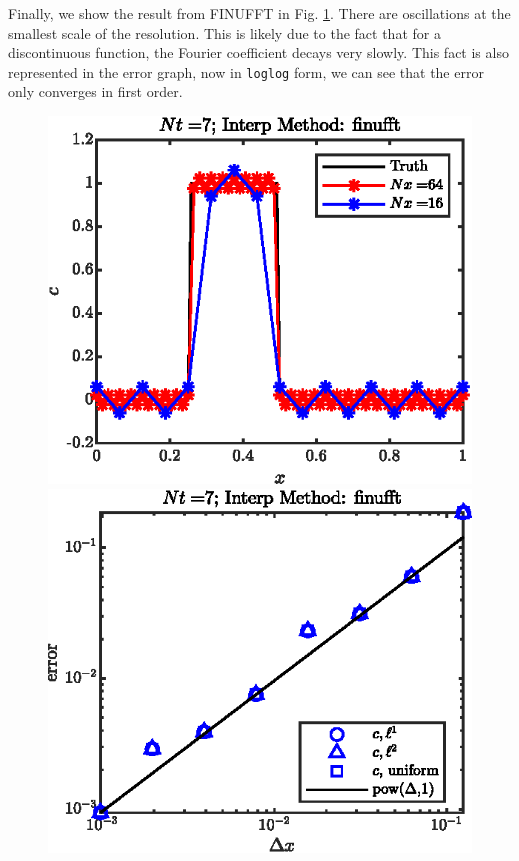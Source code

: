 \documentclass[11pt,letterpaper]{article}
\begin{document}
Finally, we show the result from FINUFFT in Fig. \ref{fig:1D_step_cons_finufft_sol}. There are oscillations at the smallest scale of the resolution. This is likely due to the fact that for a discontinuous function, the Fourier coefficient decays very slowly. This fact is also represented in the error graph, now in \texttt{loglog} form, we can see that the error only converges in first order. 
\begin{figure}[H]
    \centering
    \includegraphics{figs/1D_step_cons_finufft_sol}
    \includegraphics{figs/1D_step_cons_finufft_convord}
    \caption{}\label{fig:1D_step_cons_finufft_sol}
\end{figure}
\end{document}
